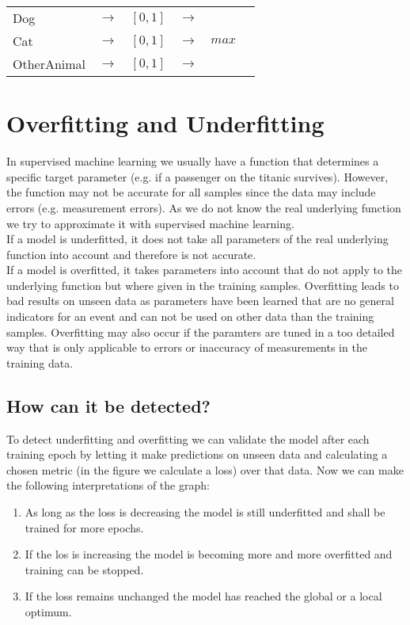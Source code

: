 \begin{tabular}{l l l l l l}
    Dog         & $\rightarrow$ & $[0, 1]$ & $\longrightarrow$ &       \\
    Cat         & $\rightarrow$ & $[0, 1]$ & $\longrightarrow$ & $max$ \\
    OtherAnimal & $\rightarrow$ & $[0, 1]$ & $\longrightarrow$ &       \\
\end{tabular}

\section{Overfitting and Underfitting}

In supervised machine learning we usually have a function that determines a specific target parameter (e.g. if a passenger on the titanic survives). However, the function may not be accurate for all samples since the data may include errors (e.g. measurement errors). As we do not know the real underlying function we try to approximate it with supervised machine learning.\\
If a model is underfitted, it does not take all parameters of the real underlying function into account and therefore is not accurate.\\
If a model is overfitted, it takes parameters into account that do not apply to the underlying function but where given in the training samples. Overfitting leads to bad results on unseen data as parameters have been learned that are no general indicators for an event and can not be used on other data than the training samples. Overfitting may also occur if the paramters are tuned in a too detailed way that is only applicable to errors or inaccuracy of measurements in the training data.

\subsection{How can it be detected?}

To detect underfitting and overfitting we can validate the model after each training epoch by letting it make predictions on unseen data and calculating a chosen metric (in the figure we calculate a loss) over that data. Now we can make the following interpretations of the graph:

\begin{enumerate}
    \item As long as the loss is decreasing the model is still underfitted and shall be trained for more epochs.
    \item If the los is increasing the model is becoming more and more overfitted and training can be stopped.
    \item If the loss remains unchanged the model has reached the global or a local optimum.
\end{enumerate}

